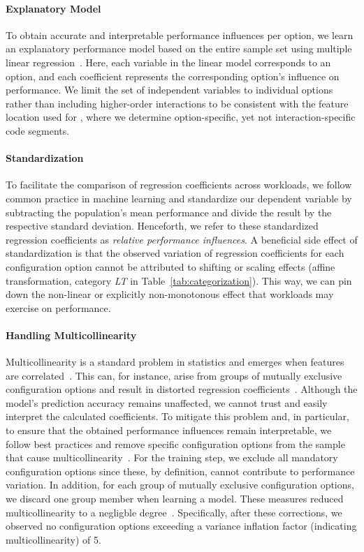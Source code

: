 {{{\paragraph*{Explanatory Model}
To obtain accurate and interpretable performance influences per option, we learn an explanatory performance model based on the entire sample set using multiple linear regression~\cite{dorn2020,siegmundPerformanceinfluenceModelsHighly2015,perLasso}. Here, each variable in the linear model corresponds to an option, and each coefficient represents the corresponding option's influence on performance. 
We limit the set of independent variables to individual options rather than including higher-order interactions to be consistent with the feature location used for , where we determine option-specific, yet not interaction-specific code segments.
\paragraph*{Standardization}
To facilitate the comparison of regression coefficients across workloads, we follow common practice in machine learning and standardize our dependent variable by subtracting the population’s mean performance and divide the result by the respective standard deviation. Henceforth, we refer to these standardized regression coefficients as \textit{relative performance influences}. A beneficial side effect of standardization is that the observed variation of regression coefficients for each configuration option cannot be attributed to shifting or scaling effects (affine transformation, category \colorbox{lt-color}{\textit{LT}} in Table~\ref{tab:categorization}). This way, we can pin down  the non-linear or explicitly non-monotonous effect that workloads may exercise on performance.
\paragraph*{Handling Multicollinearity} Multicollinearity is a standard problem in statistics and emerges when features are correlated~\cite{Daoud_2017}. This can, for instance, arise from groups of mutually exclusive configuration options and result in distorted regression coefficients~\cite{dorn2020}. Although the model's prediction accuracy remains unaffected, we cannot trust and easily interpret the calculated coefficients. To mitigate this problem and, in particular, to ensure that the obtained performance influences remain interpretable, we follow best practices and remove specific configuration options from the sample that cause multicollinearity~\cite{dorn2020}. For the training step, we exclude all mandatory configuration options since these, by definition, cannot contribute to performance variation. In addition, for each group of mutually exclusive configuration options, we discard one group member when learning a model. These measures reduced multicollinearity to a negligble degree~\cite{o2007caution}. Specifically, after these corrections, we observed no configuration options exceeding a variance inflation factor (indicating multicollinearity) of 5.


}}}
